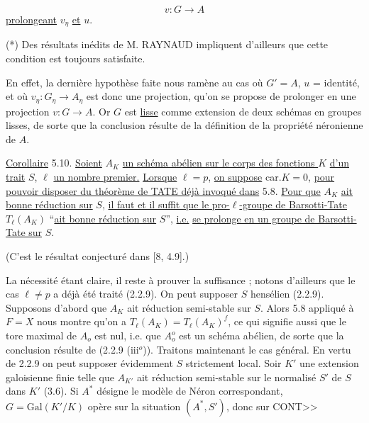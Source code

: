 \begin{equation*}
v : G \longrightarrow A
\end{equation*}
\underline{prolongeant} $v_\eta$ \underline{et} $u$.

(*) Des résultats inédits de M. RAYNAUD impliquent d'ailleurs que cette condition est toujours satisfaite.



En effet, la dernière hypothèse faite nous ramène au cas où $G'=A$, $u$ = identité, et où $v_\eta : G_\eta \longrightarrow A_\eta$ est donc une projection, qu'on se propose de prolonger en une projection $v: G \longrightarrow A$. Or $G$ est \underline{lisse} comme extension de deux schémas en groupes lisses, de sorte que la conclusion résulte de la définition de la propriété néronienne de $A$.

\underline{Corollaire} 5.10. \underline{Soient} $A_K$ \underline{un schéma abélien sur le corps des fonctions $K$} \underline{d'un trait} $S$, $\ell$ \underline{un nombre premier.} \underline{Lorsque} $\ell = p$, \underline{on suppose} car.$K = 0$, \underline{pour pouvoir disposer du théorème de TATE déjà invoqué dans} 5.8. \underline{Pour que} $A_K$ \underline{ait bonne réduction sur} $S$, \underline{il faut et il suffit que le pro-$\ell$-groupe de Barsotti-Tate} $T_\ell(A_K)$ ``\underline{ait bonne réduction sur} $S$'', \underline{i.e.} \underline{se prolonge en un groupe de Barsotti-Tate sur} $S$.

(C'est le résultat conjecturé dans [8, 4.9].)

La nécessité étant claire, il reste à prouver la suffisance ; notons d'ailleurs que le cas $\ell \neq p$ a déjà été traité (2.2.9). On peut supposer $S$ hensélien (2.2.9). Supposons d'abord que $A_K$ ait réduction semi-stable sur $S$. Alors 5.8 appliqué à $F = X$ nous montre qu'on a $T_\ell(A_K) = T_\ell(A_K)^f$, ce qui signifie aussi que le tore maximal de $A_o$ est nul, i.e. que $A_o^o$ est un schéma abélien, de sorte que la conclusion résulte de (2.2.9 (iii${}^o$)). Traitons maintenant le cas général. En vertu de 2.2.9 on peut supposer évidemment $S$ strictement local. Soir $K'$ une extension galoisienne finie telle que $A_{K'}$ ait réduction semi-stable sur le normalisé $S'$ de $S$ dans $K'$ (3.6). Si $A^*$ désigne le modèle de Néron correspondant, $G = \mathrm{Gal}(K'/K)$ opère sur la situation $(A^*,S')$, donc sur CONT>>



